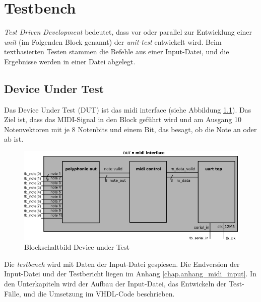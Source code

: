 
\chapter{Testbench}\label{chap.testen}
 \textit{Test Driven Development} bedeutet, dass vor oder parallel zur Entwicklung einer \textit{unit} (im Folgenden Block genannt) der \textit{unit-test} entwickelt wird\cite{Testdriven}. Beim textbasierten Testen stammen die Befehle aus einer Input-Datei, und die Ergebnisse werden in einer Datei abgelegt. 

\section{Device Under Test}\label{sec.testbench_DUT}
Das Device Under Test (DUT) ist das midi interface (siehe Abbildung \ref{fig.testbench}). Das Ziel ist, dass das MIDI-Signal in den Block geführt wird und am Ausgang 10 Notenvektoren mit je 8 Notenbits und einem Bit, das besagt, ob die Note an oder ab ist.\\
\begin{figure}[H]
	\includegraphics[width=1\textwidth]{images/midi_interface/testbench_midiinterface.png}
	\caption{Blockschaltbild Device under Test}
	\label{fig.testbench}
\end{figure} 

Die \textit{testbench} wird mit Daten der Input-Datei gespiesen. Die Endversion der Input-Datei und der Testbericht liegen im Anhang \ref{chap.anhang_midi_input}. 
In den Unterkapiteln wird der Aufbau der Input-Datei, das Entwickeln der Test-Fälle, und die Umsetzung im VHDL-Code beschrieben.


